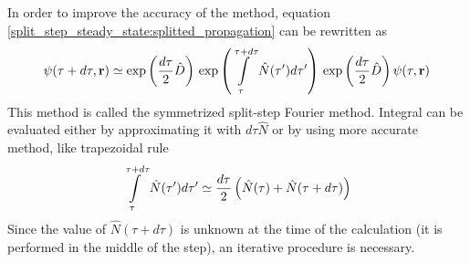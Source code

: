 \documentclass[12pt,notitlepage]{report}
\begin{document}
In order to improve the accuracy of the method, equation \ref{split_step_steady_state:splitted_propagation}
can be rewritten as
\[
\psi(\tau + d\tau, \mathbf{r}) \simeq \exp \left( \frac{d\tau}{2} \hat{D} \right) \\
\exp \left( \int\limits^{\tau + d\tau}_\tau \hat{N} (\tau^\prime) d\tau^\prime \right) \\
\exp \left( \frac{d\tau}{2} \hat{D} \right) \psi(\tau, \mathbf{r})
\]
This method is called the symmetrized split-step Fourier method. Integral can be evaluated either by approximating it
with $d\tau\hat{N}$ or by using more accurate method, like trapezoidal rule
\[
\int\limits^{\tau + d\tau}_\tau \hat{N} (\tau^\prime) d\tau^\prime \simeq \\
\frac{d\tau}{2} \left( \hat{N}(\tau) + \hat{N}(\tau + d\tau) \right)
\]
Since the value of $\hat{N}(\tau + d\tau)$ is unknown at the time of the calculation (it is performed in the
middle of the step), an iterative procedure is necessary.



\end{document}

